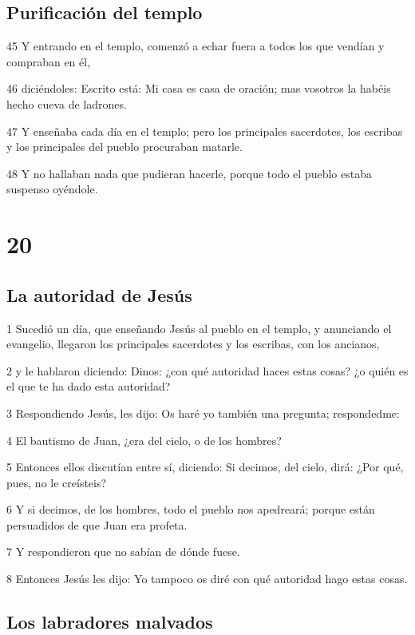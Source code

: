 \section*{Purificación del templo}

\par 45 Y entrando en el templo, comenzó a echar fuera a todos los que vendían y compraban en él,
\par 46 diciéndoles: Escrito está: Mi casa es casa de oración; mas vosotros la habéis hecho cueva de ladrones.
\par 47 Y enseñaba cada día en el templo; pero los principales sacerdotes, los escribas y los principales del pueblo procuraban matarle.
\par 48 Y no hallaban nada que pudieran hacerle, porque todo el pueblo estaba suspenso oyéndole.

\chapter{20}

\section*{La autoridad de Jesús}

\par 1 Sucedió un día, que enseñando Jesús al pueblo en el templo, y anunciando el evangelio, llegaron los principales sacerdotes y los escribas, con los ancianos,
\par 2 y le hablaron diciendo: Dinos: ¿con qué autoridad haces estas cosas? ¿o quién es el que te ha dado esta autoridad?
\par 3 Respondiendo Jesús, les dijo: Os haré yo también una pregunta; respondedme:
\par 4 El bautismo de Juan, ¿era del cielo, o de los hombres?
\par 5 Entonces ellos discutían entre sí, diciendo: Si decimos, del cielo, dirá: ¿Por qué, pues, no le creísteis?
\par 6 Y si decimos, de los hombres, todo el pueblo nos apedreará; porque están persuadidos de que Juan era profeta.
\par 7 Y respondieron que no sabían de dónde fuese.
\par 8 Entonces Jesús les dijo: Yo tampoco os diré con qué autoridad hago estas cosas.

\section*{Los labradores malvados}

